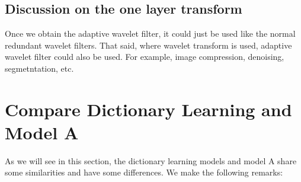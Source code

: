 \documentclass[a4paper]{article}
\begin{document}
{\subsection{Discussion on the one layer transform}
Once we obtain the adaptive wavelet filter, it could just be used like the normal redundant wavelet filters. That said, where wavelet transform is used, adaptive wavelet filter could also be used. For example, image compression, denoising, segmetntation, etc.






























\newpage
\section{Compare Dictionary Learning and Model A}
As we will see in this section, the dictionary learning models and model A share some similarities and have some differences. We make the following remarks: 

}
\end{document}
